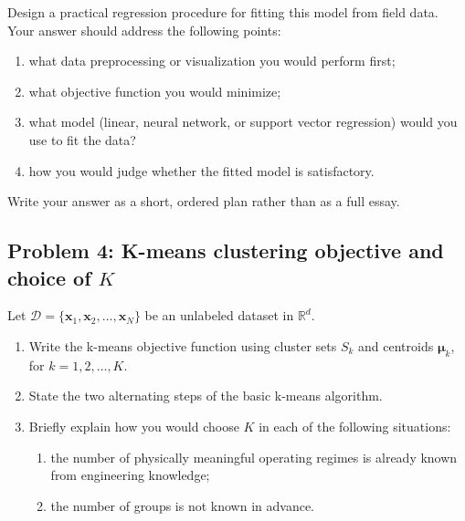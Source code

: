 \documentclass[12pt]{article}
\begin{document}
Design a practical regression procedure for fitting this model from field data. Your answer should address the following points:

\begin{enumerate}
    \renewcommand{\labelenumi}{(\alph{enumi})}
    \item what data preprocessing or visualization you would perform first;
    \item what objective function you would minimize;
    \item what model (linear, neural network, or support vector regression) would you use to fit the data?
    \item how you would judge whether the fitted model is satisfactory.
\end{enumerate}

Write your answer as a short, ordered plan rather than as a full essay.

\vspace{24pt}
\fullunderline

\vspace{20pt}
\fullunderline

\vspace{20pt}
\fullunderline

\newpage 

\subsection*{Problem 4: K-means clustering objective and choice of \(K\)}
Let \(\mathcal{D}=\{\bm{x}_1,\bm{x}_2,\ldots,\bm{x}_N\}\) be an unlabeled dataset in \(\mathbb{R}^d\).

\begin{enumerate}
    \renewcommand{\labelenumi}{(\alph{enumi})}
    \item Write the k-means objective function using cluster sets \(S_k\) and centroids \(\bm{\mu}_k\), for \(k=1,2,\ldots,K\).

    \vspace{22pt}
    \fullunderline

    \item State the two alternating steps of the basic k-means algorithm.

    \vspace{20pt}
    \fullunderline

    \item Briefly explain how you would choose \(K\) in each of the following situations:
    \begin{enumerate}
        \renewcommand{\labelenumii}{(\roman{enumii})}
        \item the number of physically meaningful operating regimes is already known from engineering knowledge;
        \item the number of groups is not known in advance.
    \end{enumerate}

    \vspace{20pt}
    \fullunderline
\end{enumerate}
\end{document}
